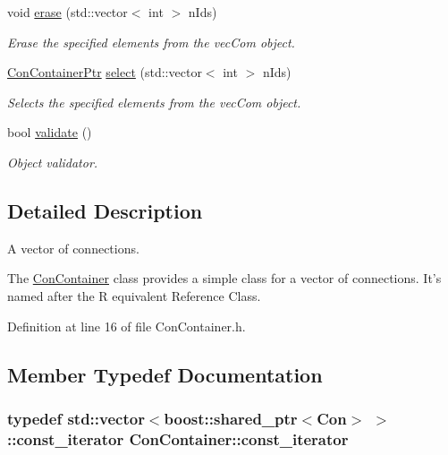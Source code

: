 \begin{DoxyCompactItemize}
void \hyperlink{class_con_container_a9665acde2f526ae4207b919c90615fe5}{erase} (std::vector$<$ int $>$ nIds)
\begin{DoxyCompactList}\small\item\em Erase the specified elements from the vecCom object. \end{DoxyCompactList}\item 
\hyperlink{_a_m_o_r_e_8h_a36205bc9da3f58511319ae429910198b}{ConContainerPtr} \hyperlink{class_con_container_a7fb490683bd4733cae3c6428bad9328c}{select} (std::vector$<$ int $>$ nIds)
\begin{DoxyCompactList}\small\item\em Selects the specified elements from the vecCom object. \end{DoxyCompactList}\item 
bool \hyperlink{class_con_container_aac12a3d3604db9ff715503816109470c}{validate} ()
\begin{DoxyCompactList}\small\item\em Object validator. \end{DoxyCompactList}\end{DoxyCompactItemize}


\subsection{Detailed Description}
A vector of connections. 

The \hyperlink{class_con_container}{ConContainer} class provides a simple class for a vector of connections. It's named after the R equivalent Reference Class. 

Definition at line 16 of file ConContainer.h.



\subsection{Member Typedef Documentation}
\hypertarget{class_con_container_ac314ee4e351b3a5f595cd1de74fb3b5e}{
\subsubsection[{const\_\-iterator}]{\setlength{\rightskip}{0pt plus 5cm}typedef std::vector$<$boost::shared\_\-ptr$<${\bf Con}$>$ $>$::{\bf const\_\-iterator} {\bf ConContainer::const\_\-iterator}}}
\label{class_con_container_ac314ee4e351b3a5f595cd1de74fb3b5e}


